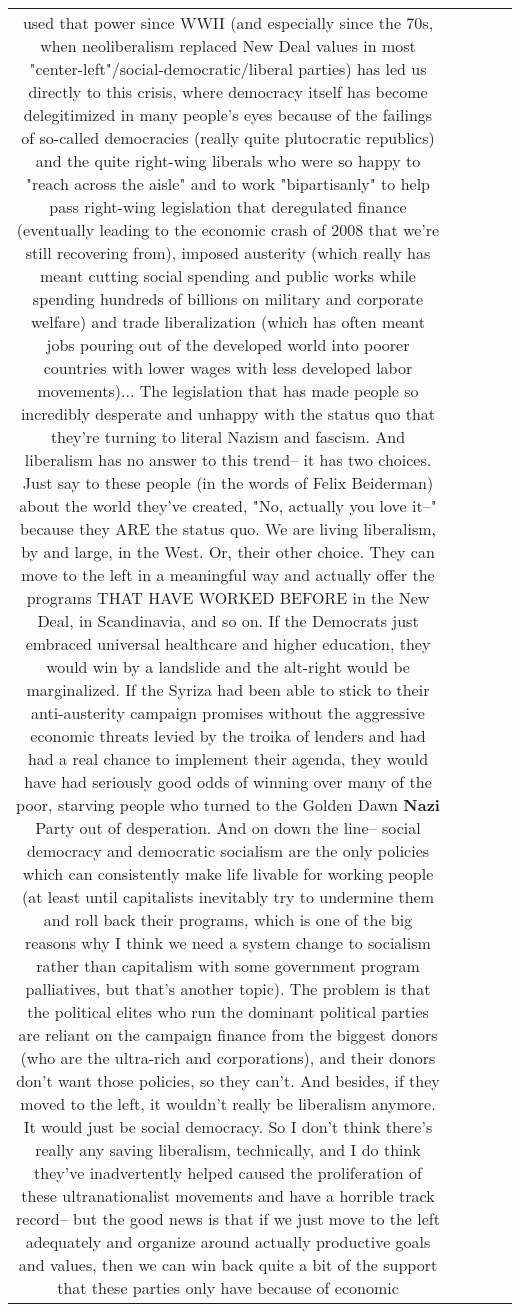 \documentclass[11pt]{article}
\newlength\mylength
\begin{document}
\begin{center}
\begin{longtable}{|C{.65\mylength}|C{.30\mylength}|C{.12\mylength}|C{.12\mylength}|C{.12\mylength}|}
used that power since WWII (and especially since the 70s, when neoliberalism replaced New Deal values in most "center-left"/social-democratic/liberal parties) has led us directly to this crisis, where democracy itself has become delegitimized in many people's eyes because of the failings of so-called democracies (really quite plutocratic republics) and the quite right-wing liberals who were so happy to "reach across the aisle" and to work "bipartisanly" to help pass right-wing legislation that deregulated finance (eventually leading to the economic crash of 2008 that we're still recovering from), imposed austerity (which really has meant cutting social spending and public works while spending hundreds of billions on military and corporate welfare) and trade liberalization (which has often meant jobs pouring out of the developed world into poorer countries with lower wages with less developed labor movements)... The legislation that has made people so incredibly desperate and unhappy with the status quo that they're turning to literal Nazism and fascism. And liberalism has no answer to this trend-- it has two choices. Just say to these people (in the words of Felix Beiderman) about the world they've created, "No, actually you love it--" because they ARE the status quo. We are living liberalism, by and large, in the West. Or, their other choice. They can move to the left in a meaningful way and actually offer the programs THAT HAVE WORKED BEFORE in the New Deal, in Scandinavia, and so on. If the Democrats just embraced universal healthcare and higher education, they would win by a landslide and the alt-right would be marginalized. If the Syriza had been able to stick to their anti-austerity campaign promises without the aggressive economic threats levied by the troika of lenders and had had a real chance to implement their agenda, they would have had seriously good odds of winning over many of the poor, starving people who turned to the Golden Dawn \textbf{Nazi} Party out of desperation. And on down the line-- social democracy and democratic socialism are the only policies which can consistently make life livable for working people (at least until capitalists inevitably try to undermine them and roll back their programs, which is one of the big reasons why I think we need a system change to socialism rather than capitalism with some government program palliatives, but that's another topic). The problem is that the political elites who run the dominant political parties are reliant on the campaign finance from the biggest donors (who are the ultra-rich and corporations), and their donors don't want those policies, so they can't. And besides, if they moved to the left, it wouldn't really be liberalism anymore. It would just be social democracy. So I don't think there's really any saving liberalism, technically, and I do think they've inadvertently helped caused the proliferation of these ultranationalist movements and have a horrible track record-- but the good news is that if we just move to the left adequately and organize around actually productive goals and values, then we can win back quite a bit of the support that these parties only have because of economic 
\end{longtable}
\end{center}
\end{document}
